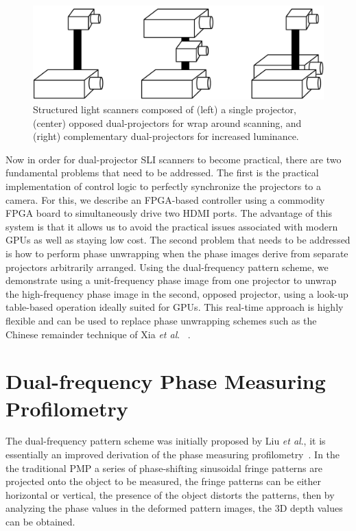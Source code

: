 \documentclass[]{spie}  %
\begin{document}
\begin{figure}
\centerline{\includegraphics[width=5.0in]{Figures/Layouts}}
\vspace{0.1in}
\caption{Structured light scanners composed of (left) a single projector, (center) opposed dual-projectors for wrap around scanning, and (right) complementary dual-projectors for increased luminance.}
\label{Fig:10}
\end{figure} 

Now in order for dual-projector SLI scanners to become practical, there are two fundamental problems that need to be addressed.  The first is the practical implementation of control logic to perfectly synchronize the projectors to a camera.  For this, we describe an FPGA-based controller using a commodity FPGA board to simultaneously drive two HDMI ports.  The advantage of this system is that it allows us to avoid the practical issues associated with modern GPUs as well as staying low cost.  The second problem that needs to be addressed is how to perform phase unwrapping when the phase images derive from separate projectors arbitrarily arranged.  Using the dual-frequency pattern scheme, we demonstrate using a unit-frequency phase image from one projector to unwrap the high-frequency phase image in the second, opposed projector, using a look-up table-based operation ideally suited for GPUs. This real-time approach is highly flexible and can be used to replace phase unwrapping schemes such as the Chinese remainder technique of Xia \textit{et al}. ~\cite{xiax07}.

\section{Dual-frequency Phase Measuring Profilometry}
The dual-frequency pattern scheme was initially proposed by Liu \textit{et al}.\cite{liuk10}, it is essentially  an improved derivation of the phase measuring profilometry~\cite{hali89}. In the the traditional PMP a series of phase-shifting sinusoidal fringe patterns are projected onto the object to be measured, the fringe patterns can be either horizontal or vertical, the presence of the object distorts the patterns, then by analyzing the phase values in the deformed pattern images, the 3D depth values can be obtained.
\end{document}
